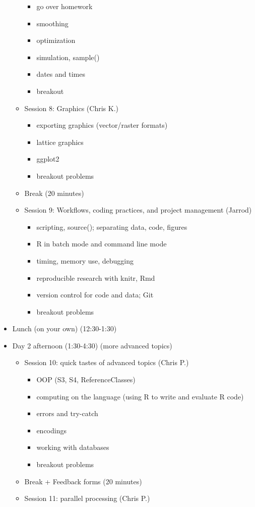 \documentclass[12pt]{article}\usepackage{graphicx, color}
\begin{document}
\begin{itemize}
\begin{itemize}
\begin{itemize}
\item go over homework
\item smoothing
\item optimization
\item simulation, sample()
\item dates and times
\item breakout 
\end{itemize}
\item Session 8: Graphics (Chris K.)

\begin{itemize}
\item exporting graphics (vector/raster formats)
\item lattice graphics
\item ggplot2
\item breakout problems 
\end{itemize}
\item Break (20 minutes)
\item Session 9: Workflows, coding practices, and project management (Jarrod)

\begin{itemize}
\item scripting, source(); separating data, code, figures
\item R in batch mode and command line mode
\item timing, memory use, debugging
\item reproducible research with knitr, Rmd
\item version control for code and data; Git
\item breakout problems
\end{itemize}
\end{itemize}
\item Lunch (on your own) (12:30-1:30)
\item Day 2 afternoon (1:30-4:30) (more advanced topics) 

\begin{itemize}
\item Session 10: quick tastes of advanced topics (Chris P.)

\begin{itemize}
\item OOP (S3, S4, ReferenceClasses)
\item computing on the language (using R to write and evaluate R code)
\item errors and try-catch
\item encodings
\item working with databases
\item breakout problems
\end{itemize}
\item Break + Feedback forms (20 minutes)
\item Session 11: parallel processing (Chris P.)


\end{itemize}
\end{itemize}
\end{document}
